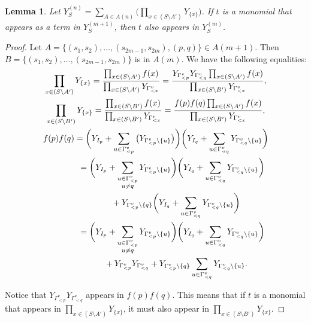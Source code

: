 \documentclass[pdftex]{sigma}
\numberwithin{equation}{section}
\newtheorem{Lemma}[Theorem]{Lemma}
\begin{document}
\begin{Lemma}\label{lem:Y-term-containment}
Let $Y_S^{(n)}=\sum_{A\in A
(n)}\big(\prod_{x\in (S\setminus A')}Y_{\{x\}}\big)$. If $t$ is a monomial that appears as a term in $Y_S^{(m+1)}$, then $t$ also appears in $Y_S^{(m)}$.
\end{Lemma}

\begin{proof}
Let $A=\{(s_1,s_2),\dots,(s_{2m-1},s_{2m}),(p,q)\}\in A(m+1)$. Then $B=\{(s_1,s_2),\dots,(s_{2m-1},\allowbreak s_{2m})\}$ is in $A(m)$. We have the following equalities:
\begin{gather*}
\prod_{x\in (S\setminus A')}Y_{\{x\}} =\frac{\prod_{x\in (S\setminus A')}f(x)}{\prod_{x\in (S\setminus A')}Y_{\Gamma_{< x}^v}}=\frac{Y_{\Gamma_{< p}^v}Y_{\Gamma_{< q}^v}\prod_{x\in (S\setminus A')}f(x)}{\prod_{x\in (S\setminus B')}Y_{\Gamma_{< x}^v}}, \\
\prod_{x\in (S\setminus B')}Y_{\{x\}} =\frac{\prod_{x\in (S\setminus B')}f(x)}{\prod_{x\in (S\setminus B')}Y_{\Gamma_{< x}^v}}=\frac{f(p)f(q)\prod_{x\in (S\setminus A')}f(x)}{\prod_{x\in (S\setminus B')}Y_{\Gamma_{< x}^v}},\\
f(p)f(q)= \bigg(Y_{I_{p}}+\sum_{u\in\Gamma_{\lessdot p}^v}\big(Y_{\Gamma_{< p}^v\setminus\{u\}}\big)\bigg)\bigg(Y_{I_{q}}+\sum_{u\in\Gamma_{\lessdot q}^v}Y_{\Gamma_{< q}^v\setminus\{u\}}\bigg)\\
\hphantom{f(p)f(q)}{}
= \bigg(Y_{I_{p}}+\sum_{\substack{u\in\Gamma_{\lessdot p}^v\\u\neq q}}Y_{\Gamma_{< p}^v\setminus\{u\}}\bigg)\bigg(Y_{I_{q}}+\sum_{u\in\Gamma_{\lessdot q}^v}Y_{\Gamma_{< q}^v\setminus\{u\}}\bigg) \\
\hphantom{f(p)f(q)=}{}+ Y_{\Gamma_{< p}^v\setminus\{q\}}\bigg(Y_{I_{q}}+\sum_{u\in\Gamma_{\lessdot q}^v}Y_{\Gamma_{< q}^v\setminus\{u\}}\bigg)\\
\hphantom{f(p)f(q)}{} = \bigg(Y_{I_{p}}+\sum_{\substack{u\in\Gamma_{\lessdot p}^v\\u\neq q}}Y_{\Gamma_{< p}^v\setminus\{u\}}\bigg)\bigg(Y_{I_{q}}+\sum_{u\in\Gamma_{\lessdot q}^v}Y_{\Gamma_{< q}^v\setminus\{u\}}\bigg)\\
\hphantom{f(p)f(q)=}{} + Y_{\Gamma_{< p}^v}Y_{\Gamma_{< q}^v}+Y_{\Gamma_{< p}^v\setminus\{q\}}\sum_{u\in\Gamma_{\lessdot q}^v}Y_{\Gamma_{< q}^v\setminus\{u\}}.
\end{gather*}

Notice that $Y_{\Gamma_{< p}^v}Y_{\Gamma_{< q}^v}$ appears in $f(p)f(q)$. This means that if $t$ is a monomial that appears in $\prod_{x\in (S\setminus A')}Y_{\{x\}}$, it must also appear in $\prod_{x\in (S\setminus B')}Y_{\{x\}}$.
\end{proof}
\end{document}
